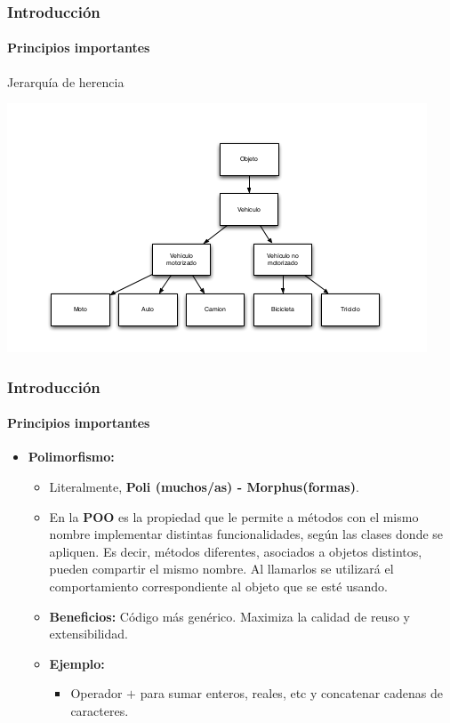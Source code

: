 \documentclass{beamer}
\begin{document}
		\begin{frame}
			\frametitle{Introducci\'on}
			\framesubtitle{Principios importantes}

			\begin{exampleblock}{Jerarqu\'ia de herencia}
				\begin{center}
					\includegraphics[scale=.55]{images/jerarquia_2.png}
				\end{center}
			\end{exampleblock}
		\end{frame}

		\begin{frame}
			\frametitle{Introducci\'on}
			\framesubtitle{Principios importantes}

			\begin{itemize}
				\item \textbf{Polimorfismo:}
				\begin{itemize}
  					\item Literalmente, \textbf{Poli (muchos/as) - Morphus(formas)}.
  					\item En la \textbf{POO} es la propiedad que le permite a m\'etodos con el mismo nombre implementar distintas funcionalidades, seg\'un las clases donde se apliquen. Es decir, m\'etodos diferentes, asociados a objetos distintos, pueden compartir el mismo nombre. Al llamarlos se utilizar\'a el comportamiento correspondiente al objeto que se est\'e usando.
					\item \textbf{Beneficios:} C\'odigo m\'as gen\'erico. Maximiza la calidad de reuso y extensibilidad.
  					\item \textbf{Ejemplo:}
					\begin{itemize}
						\item Operador \textbf{$+$} para sumar enteros, reales, etc y concatenar cadenas de caracteres.
					\end{itemize}
				\end{itemize}
			\end{itemize}
		\end{frame}
\end{document}
